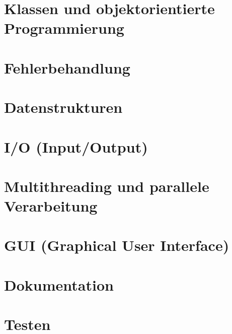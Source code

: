 \section{Klassen und objektorientierte Programmierung} \oopMark
	

\section{Fehlerbehandlung} \functionalMark \imperativeMark \oopMark
	

%	

\section{Datenstrukturen} \functionalMark \imperativeMark \oopMark
	

\section{I/O (Input/Output)} \functionalMark \imperativeMark \oopMark
	

\section{Multithreading und parallele Verarbeitung} \functionalMark \imperativeMark \oopMark
	

\section{GUI (Graphical User Interface)} \functionalMark \imperativeMark \oopMark
	

\section{Dokumentation} \functionalMark \imperativeMark \oopMark
	

\section{Testen} \functionalMark \imperativeMark \oopMark
	
